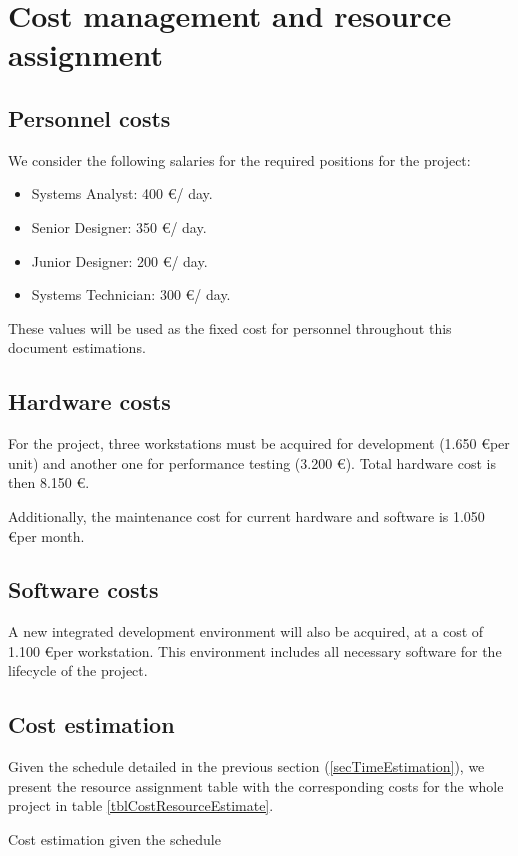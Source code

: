 \section{Cost management and resource assignment}

\subsection{Personnel costs}

We consider the following salaries for the required positions for the project:

\begin{itemize}
\item Systems Analyst: 400 \euro / day.
\item Senior Designer: 350 \euro / day.
\item Junior Designer: 200 \euro / day.
\item Systems Technician: 300 \euro / day.
\end{itemize}

These values will be used as the fixed cost for personnel throughout this document estimations.

\subsection{Hardware costs}

For the project, three workstations must be acquired for development (1.650 \euro per unit) and another one for performance testing (3.200 \euro). Total hardware cost is then 8.150 \euro.

Additionally, the maintenance cost for current hardware and software is 1.050 \euro per month.

\subsection{Software costs}

A new integrated development environment will also be acquired, at a cost of 1.100 \euro per workstation. This environment includes all necessary software for the lifecycle of the project.

\subsection{Cost estimation}

Given the schedule detailed in the previous section (\ref{secTimeEstimation}), we present the resource assignment table with the corresponding costs for the whole project in table \ref{tblCostResourceEstimate}.

\begin{table}[hbtp]
\centering

\caption{Cost estimation given the schedule}
\label{tblCostResourceEstimate}
\end{table}

